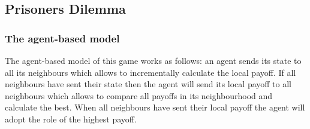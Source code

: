 \subsection{Prisoners Dilemma}
\subsubsection{The agent-based model}
The agent-based model of this game works as follows: an agent sends its state to all its neighbours which allows to incrementally calculate the local payoff. If all neighbours have sent their state then the agent will send its local payoff to all neighbours which allows to compare all payoffs in its neighbourhood and calculate the best. When all neighbours have sent their local payoff the agent will adopt the role of the highest payoff.

